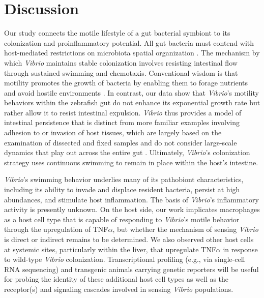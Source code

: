 {{{{{{{\section{Discussion}
Our study connects the motile lifestyle of a gut bacterial symbiont to its colonization and proinflammatory potential. All gut bacteria must contend with host-mediated restrictions on microbiota spatial organization \cite{donaldson_gut_2015,tropini_gut_2017,byndloss_healthy_2018}. The mechanism by which \textit{Vibrio} maintains stable colonization involves resisting intestinal flow through sustained swimming and chemotaxis. Conventional wisdom is that motility promotes the growth of bacteria by enabling them to forage nutrients and avoid hostile environments \cite{wei_population_2011,stecher_motility_2008,rivera-chavez_energy_2016}. In contrast, our data show that \textit{Vibrio}'s motility behaviors within the zebrafish gut do not enhance its exponential growth rate but rather allow it to resist intestinal expulsion. \textit{Vibrio} thus provides a model of intestinal persistence that is distinct from more familiar examples involving adhesion to or invasion of host tissues, which are largely based on the examination of dissected and fixed samples and do not consider large-scale dynamics that play out across the entire gut \cite{mcloughlin_host_2016,schluter_adhesion_2015,donaldson_gut_2018}. Ultimately, \textit{Vibrio}'s colonization strategy uses continuous swimming to remain in place within the host's intestine.

\textit{Vibrio}'s swimming behavior underlies many of its pathobiont characteristics, including its ability to invade and displace resident bacteria, persist at high abundances, and stimulate host inflammation. The basis of \textit{Vibrio}'s inflammatory activity is presently unknown. On the host side, our work implicates macrophages as a host cell type that is capable of responding to \textit{Vibrio}'s motile behavior through the upregulation of TNF$\alpha$, but whether the mechanism of sensing \textit{Vibrio} is direct or indirect remains to be determined. We also observed other host cells at systemic sites, particularly within the liver, that upregulate TNF$\alpha$ in response to wild-type \textit{Vibrio} colonization. Transcriptional profiling (e.g., via single-cell RNA sequencing) and transgenic animals carrying genetic reporters will be useful for probing the identity of these additional host cell types as well as the receptor(s) and signaling cascades involved in sensing \textit{Vibrio} populations.  

}}}}}}}
